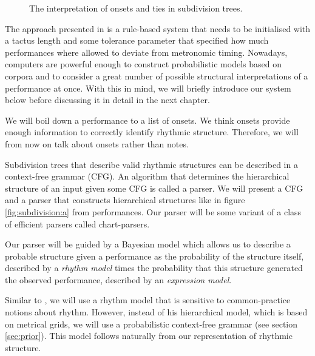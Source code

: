 \begin{figure}
\centering
{}

\caption{The interpretation of onsets and ties in subdivision trees.}
\label{fig:ties}
\end{figure}

The approach presented in \citet{longuet1976perception} is a rule-based system that needs to be initialised with a tactus length and some tolerance parameter that specified how much performances where allowed to deviate from metronomic timing. Nowadays, computers are powerful enough to construct probabilistic models based on corpora and to consider a great number of possible structural interpretations of a performance at once. With this in mind, we will briefly introduce our system below before discussing it in detail in the next chapter.

We will boil down a performance to a list of onsets. We think onsets provide enough information to correctly identify rhythmic structure. Therefore, we will from now on talk about onsets rather than notes.

Subdivision trees that describe valid rhythmic structures can be described in a context-free grammar (CFG). An algorithm that determines the hierarchical structure of an input given some CFG is called a parser. We will present a CFG and a parser that constructs hierarchical structures like in figure \ref{fig:subdivision:a} from performances. Our parser will be some variant of a class of efficient parsers called chart-parsers.

Our parser will be guided by a Bayesian model which allows us to describe a probable structure given a performance as the probability of the structure itself, described by a \textit{rhythm model} times the probability that this structure generated the observed performance, described by an \textit{expression model}.

Similar to \cite{temperley2009unified}, we will use a rhythm model that is sensitive to common-practice notions about rhythm. However, instead of his hierarchical model, which is based on metrical grids, we will use a probabilistic context-free grammar (see section \ref{sec:prior}). This model follows naturally from our representation of rhythmic structure.

